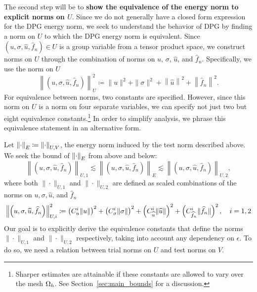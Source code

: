 The second step will be to \textbf{show the equivalence of the energy norm to explicit norms on $U$}. Since we do not generally have a closed form expression for the DPG energy norm, we seek to understand the behavior of DPG by finding a norm on $U$ to which the DPG energy norm is equivalent. Since $\left(u,\sigma,\widehat{u},\widehat{f}_n\right)\in U$ is a group variable from a tensor product space, we construct norms on $U$ through the combination of norms on $u$, $\sigma$, $\widehat{u}$, and $\widehat{f}_n$. Specifically, we use the norm on $U$ 
\begin{equation}
\left\| \left(u,\sigma,\widehat{u},\widehat{f}_n\right)\right \|_{U}^2 \coloneqq \|u\|^2 + \|\sigma\|^2 + \left\|\widehat{u}\right\|^2 + \left\|\widehat{f}_n\right\|^2.
\end{equation}
For equivalence between norms, two constants are specified. However, since this norm on $U$ is a norm on four separate variables, we can specify not just two but eight equivalence constants.\footnote{Sharper estimates are attainable if these constants are allowed to vary over the mesh $\Oh$. See Section~\ref{sec:main_bounds} for a discussion.} In order to simplify analysis, we phrase this equivalence statement in an alternative form. 

Let $\nor{\cdot}_E \coloneqq \nor{\cdot}_{U,V}$, the energy norm induced by the test norm described above. We seek the bound of $\nor{\cdot}_E$ from above and below:
\[
\left\| \left(u,\sigma,\widehat{u},\widehat{f}_n\right)\right \|_{U,1} \lesssim  \left\| \left(u,\sigma,\widehat{u},\widehat{f}_n\right)\right \|_E \lesssim \left\| \left(u,\sigma,\widehat{u},\widehat{f}_n\right)\right \|_{U,2},
\]
where both $\|\cdot\|_{U,1}$ and $\|\cdot\|_{U,2}$ are defined as scaled combinations of the norms on $u, \sigma, \widehat{u}$, and $\widehat{f}_n$
\begin{equation}
\eqnlab{uNorms}
\left\| \left(u,\sigma,\widehat{u},\widehat{f}_n\right)\right \|_{U,i}^2 \coloneqq \left(C_u^i\|u\|\right)^2 + \left(C_\sigma^i\|\sigma\|\right)^2 + \left(C_{\widehat{u}}^i\|\widehat{u}\|\right)^2 + \left(C_{\widehat{f}_n}^i\|\widehat{f}_n\|\right)^2,\quad i = 1,2
\end{equation}
Our goal is to explicitly derive the equivalence constants 
that define the norms $\|\cdot\|_{U,1}$ and $\|\cdot\|_{U,2}$ respectively, taking into account any dependency on $\epsilon$. To do so, we need a relation between trial norms on $U$ and test norms on $V$.


